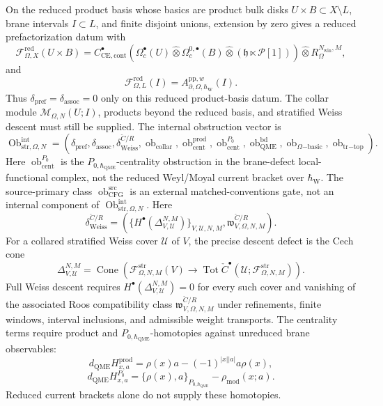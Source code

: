 \begin{stmt}
  On the reduced product basis whose basics are product bulk disks
  \(U\times B\subset X\setminus L\), brane intervals \(I\subset L\), and
  finite disjoint unions, extension by zero gives a reduced
  prefactorization datum with
  \[
    \mathcal F^{\mathrm{red}}_{\Omega,X}(U\times B)
    =
    C^\bullet_{\mathrm{CE},\mathrm{cont}}
    \left(
      \Omega_c^\bullet(U)\widehat\otimes
      \Omega_c^{0,\bullet}(B)\widehat\otimes
      (\mathfrak h\ltimes\mathcal P[1])
    \right)\widehat\otimes R_\Omega^{N_{\mathrm{win}},M},
  \]
  and
  \[
    \mathcal F^{\mathrm{red}}_{\Omega,L}(I)
    =
    A^{\mathrm{pp},w}_{\partial,\Omega,\hbar_{\mathrm{W}}}(I).
  \]
  Thus \(\delta_{\mathrm{pref}}=\delta_{\mathrm{assoc}}=0\) only on this
  reduced product-basis datum.  The collar module
  \(\mathcal M_{\Omega,N}(U;I)\), products beyond the reduced basis,
  and stratified Weiss descent must still be supplied.  The internal
  obstruction vector is
  \[
    \operatorname{Ob}^{\mathrm{int}}_{\mathrm{str},\Omega,N}
    =
    (\delta_{\mathrm{pref}},
     \delta_{\mathrm{assoc}},
     \delta_{\mathrm{Weiss}}^{\check C/R},
     \operatorname{ob}_{\mathrm{collar}},
     \operatorname{ob}^{\mathrm{prod}}_{\mathrm{cent}},
     \operatorname{ob}^{P_0}_{\mathrm{cent}},
     \operatorname{ob}^{\mathrm{bd}}_{\mathrm{QME}},
     \operatorname{ob}_{\Omega\mathrm{-basic}},
     \operatorname{ob}_{\mathrm{tr}\mathrm{-top}}).
  \]
  Here \(\operatorname{ob}^{P_0}_{\mathrm{cent}}\) is the
  \(P_{0,\hbar_{\mathrm{QME}}}\)-centrality obstruction in the
  brane-defect local-functional complex, not the reduced Weyl/Moyal
  current bracket over \(\hbar_{\mathrm{W}}\).  The source-primary class
  \(\operatorname{ob}^{\mathrm{src}}_{\mathrm{CFG}}\) is an external
  matched-conventions gate, not an internal component of
  \(\operatorname{Ob}^{\mathrm{int}}_{\mathrm{str},\Omega,N}\).
  Here
  \[
    \delta_{\mathrm{Weiss}}^{\check C/R}
    =
    \left(
      \{H^\bullet(\Delta^{N,M}_{V,\mathcal U})\}_{V,\mathcal U,N,M},
      \mathfrak w^{\check C/R}_{V,\Omega,N,M}
    \right).
  \]
  For a collared stratified Weiss cover \(\mathcal U\) of \(V\), the
  precise descent defect is the Cech cone
  \[
    \Delta^{N,M}_{V,\mathcal U}
    =
    \operatorname{Cone}\!\left(
      \mathcal F^{\mathrm{str}}_{\Omega,N,M}(V)
      \to
      \operatorname{Tot}\check C^\bullet
      (\mathcal U;\mathcal F^{\mathrm{str}}_{\Omega,N,M})
    \right).
  \]
  Full Weiss descent requires \(H^\bullet(\Delta^{N,M}_{V,\mathcal U})=0\)
  for every such cover and vanishing of the associated Roos
  compatibility class
  \(\mathfrak w^{\check C/R}_{V,\Omega,N,M}\) under refinements, finite
  windows, interval inclusions, and admissible weight transports.
  The centrality terms require product and
  \(P_{0,\hbar_{\mathrm{QME}}}\)-homotopies
  against unreduced brane observables:
  \[
    d_{\mathrm{QME}}H^{\mathrm{prod}}_{x,a}
    =
    \rho(x)a-(-1)^{|x||a|}a\rho(x),
  \]
  \[
    d_{\mathrm{QME}}H^{P_0}_{x,a}
    =
    \{\rho(x),a\}_{P_{0,\hbar_{\mathrm{QME}}}}
    -\rho_{\mathrm{mod}}(x;a).
  \]
  Reduced current brackets alone do not supply these homotopies.


\end{stmt}
